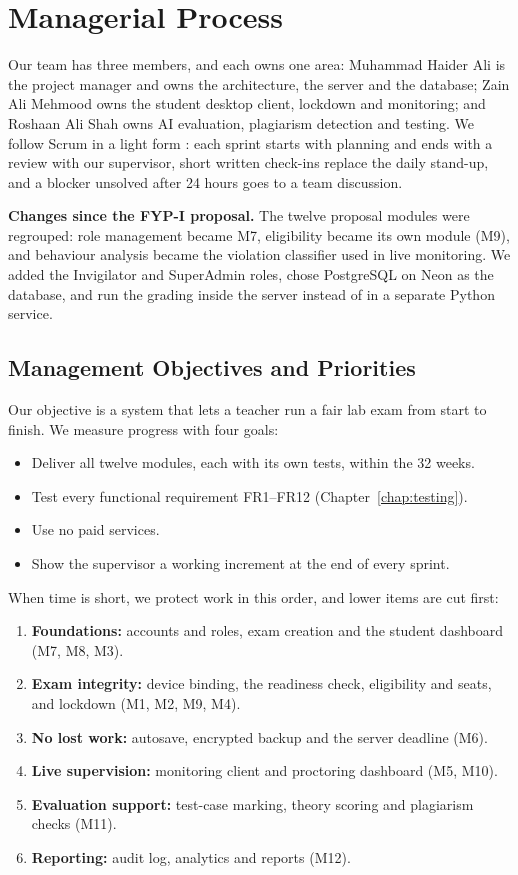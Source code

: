 \section{Managerial Process}
\label{sec:managerial}

Our team has three members, and each owns one area: Muhammad Haider Ali is the project manager and owns the architecture, the server and the database; Zain Ali Mehmood owns the student desktop client, lockdown and monitoring; and Roshaan Ali Shah owns AI evaluation, plagiarism detection and testing. We follow Scrum in a light form \cite{scrumguide2020}: each sprint starts with planning and ends with a review with our supervisor, short written check-ins replace the daily stand-up, and a blocker unsolved after 24 hours goes to a team discussion.

\textbf{Changes since the FYP-I proposal.} The twelve proposal modules were regrouped: role management became M7, eligibility became its own module (M9), and behaviour analysis became the violation classifier used in live monitoring. We added the Invigilator and SuperAdmin roles, chose PostgreSQL on Neon as the database, and run the grading inside the server instead of in a separate Python service.

\subsection{Management Objectives and Priorities}
\label{sec:priorities}

Our objective is a system that lets a teacher run a fair lab exam from start to finish. We measure progress with four goals:
\begin{itemize}[nosep]
    \item Deliver all twelve modules, each with its own tests, within the 32 weeks.
    \item Test every functional requirement FR1--FR12 (Chapter~\ref{chap:testing}).
    \item Use no paid services.
    \item Show the supervisor a working increment at the end of every sprint.
\end{itemize}

When time is short, we protect work in this order, and lower items are cut first:
\begin{enumerate}[nosep]
    \item \textbf{Foundations:} accounts and roles, exam creation and the student dashboard (M7, M8, M3).
    \item \textbf{Exam integrity:} device binding, the readiness check, eligibility and seats, and lockdown (M1, M2, M9, M4).
    \item \textbf{No lost work:} autosave, encrypted backup and the server deadline (M6).
    \item \textbf{Live supervision:} monitoring client and proctoring dashboard (M5, M10).
    \item \textbf{Evaluation support:} test-case marking, theory scoring and plagiarism checks (M11).
    \item \textbf{Reporting:} audit log, analytics and reports (M12).
\end{enumerate}

